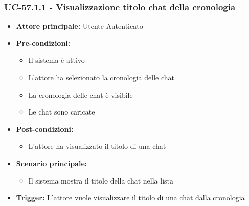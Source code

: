 \documentclass[a4paper,12pt]{article}
\begin{document}
\subsubsection{UC-57.1.1 - Visualizzazione titolo chat della cronologia} \label{subsec:UC-57.1.1}
\begin{itemize}
    \item \textbf{Attore principale:} Utente Autenticato
    \item \textbf{Pre-condizioni:}
    \begin{itemize}
        \item Il sistema è attivo
        \item L'attore ha selezionato la cronologia delle chat
        \item La cronologia delle chat è visibile
        \item Le chat sono caricate
    \end{itemize}
    \item \textbf{Post-condizioni:} 
    \begin{itemize}
        \item L'attore ha visualizzato il titolo di una chat
    \end{itemize}
    \item \textbf{Scenario principale:} 
    \begin{itemize}
        \item Il sistema mostra il titolo della chat nella lista
    \end{itemize}
    \item \textbf{Trigger:} L'attore vuole visualizzare il titolo di una chat dalla cronologia
\end{itemize}

\end{document}
